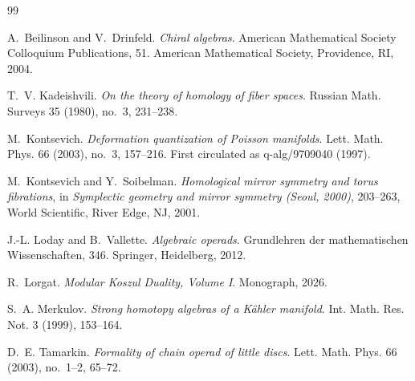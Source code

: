 \documentclass[11pt,reqno]{amsart}
\theoremstyle{definition}
\theoremstyle{remark}
\numberwithin{equation}{section}
\begin{document}
\begin{thebibliography}{99}

A.~Beilinson and V.~Drinfeld.
\emph{Chiral algebras}.
American Mathematical Society Colloquium Publications, 51.
American Mathematical Society, Providence, RI, 2004.

T.~V. Kadeishvili.
\emph{On the theory of homology of fiber spaces}.
Russian Math. Surveys 35 (1980), no.~3, 231--238.

M.~Kontsevich.
\emph{Deformation quantization of Poisson manifolds}.
Lett. Math. Phys. 66 (2003), no.~3, 157--216.
First circulated as q-alg/9709040 (1997).

M.~Kontsevich and Y.~Soibelman.
\emph{Homological mirror symmetry and torus fibrations}, in
\emph{Symplectic geometry and mirror symmetry (Seoul, 2000)},
203--263, World Scientific, River Edge, NJ, 2001.

J.-L. Loday and B.~Vallette.
\emph{Algebraic operads}.
Grundlehren der mathematischen Wissenschaften, 346.
Springer, Heidelberg, 2012.

R.~Lorgat.
\emph{Modular Koszul Duality, Volume I}.
Monograph, 2026.

S.~A. Merkulov.
\emph{Strong homotopy algebras of a K\"ahler manifold}.
Int. Math. Res. Not. 3 (1999), 153--164.

D.~E. Tamarkin.
\emph{Formality of chain operad of little discs}.
Lett. Math. Phys. 66 (2003), no.~1--2, 65--72.

\end{thebibliography}
\end{document}
